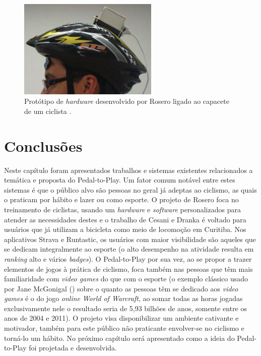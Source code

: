 \begin{figure}[t]
    \caption[Protótipo de \textit{hardware} desenvolvido por Rosero ligado ao capacete de um ciclista]{Protótipo de \textit{hardware} desenvolvido por Rosero ligado ao capacete de um ciclista \cite{gaidos2012}.}
    \centerline{\includegraphics[width=18em]{figuras/rosero.png}}
    \label{fig:rosero}
\end{figure}

\section{Conclusões}
Neste capítulo foram apresentados trabalhos e sistemas existentes relacionados a temática e proposta do Pedal-to-Play. Um fator comum notável entre estes sistemas é que o público alvo são pessoas no geral já adeptas ao ciclismo, as quais o praticam por hábito e lazer ou como esporte. O projeto de Rosero foca no treinamento de ciclistas, usando um \textit{hardware} e \textit{software} personalizados para atender as necessidades destes e o trabalho de Cesani e Dranka é voltado para usuários que já utilizam a bicicleta como meio de locomoção em Curitiba. Nos aplicativos Strava e Runtastic, os usuários com maior visibilidade são aqueles que se dedicam integralmente ao esporte (o alto desempenho na atividade resulta em \textit{ranking} alto e vários \textit{badges}). O Pedal-to-Play por sua vez, ao se propor a trazer elementos de jogos à prática de ciclismo, foca também nas pessoas que têm mais familiaridade com \textit{video games} do que com o esporte (o exemplo clássico usado por Jane
McGonigal (\citeyearpar{mcgonigal2011reality}) sobre o quanto as pessoas têm se dedicado aos \textit{video games} é o do jogo \textit{online} \textit{World of
Warcraft}, ao somar todas as horas jogadas exclusivamente nele o resultado seria de 5,93 bilhões de anos, somente entre os anos de 2004 e 2011). O projeto visa  disponibilizar um ambiente cativante e motivador, também para este público não praticante envolver-se no ciclismo e torná-lo um hábito. No próximo capítulo será apresentado como a ideia do Pedal-to-Play foi projetada e desenvolvida.